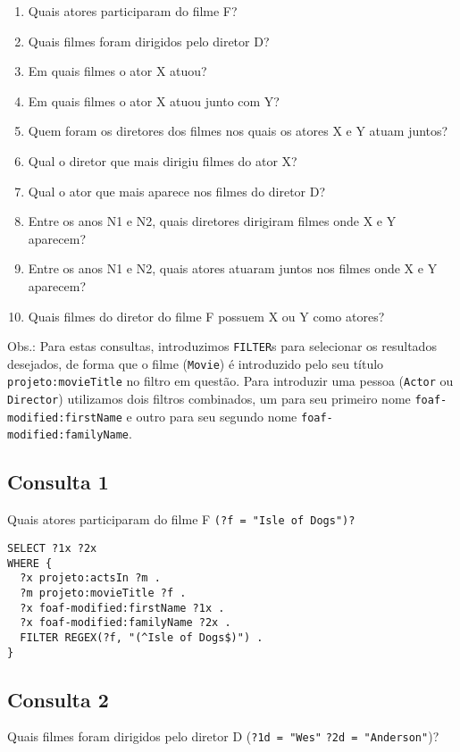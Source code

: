 \documentclass{article}
\newcommand{\code}[1]{\lstinline[mathescape=true]{#1}}
\begin{document}
\begin{enumerate}
  \item Quais atores participaram do filme F?
  \item Quais filmes foram dirigidos pelo diretor D?
  \item Em quais filmes o ator X atuou?
  \item Em quais filmes o ator X atuou junto com Y?
  \item Quem foram os diretores dos filmes nos quais os atores X e Y atuam juntos?
  \item Qual o diretor que mais dirigiu filmes do ator X?
  \item Qual o ator que mais aparece nos filmes do diretor D?
  \item Entre os anos N1 e N2, quais diretores dirigiram filmes onde X e Y aparecem?
  \item Entre os anos N1 e N2, quais atores atuaram juntos nos filmes onde X e Y aparecem?
  \item Quais filmes do diretor do filme F possuem X ou Y como atores?
\end{enumerate}

Obs.: Para estas consultas, introduzimos \code{FILTER}s para selecionar os resultados desejados, de forma que o filme (\code{Movie}) é introduzido pelo seu título \code{projeto:movieTitle} no filtro em questão. Para introduzir uma pessoa (\code{Actor} ou \code{Director}) utilizamos dois filtros combinados, um para seu primeiro nome \code{foaf-modified:firstName} e outro para seu segundo nome \code{foaf-modified:familyName}.
\subsection{Consulta 1}

Quais atores participaram do filme F \code{(?f = "Isle of Dogs")?}

\begin{lstlisting}[basicstyle=\ttfamily,frame=single]
SELECT ?1x ?2x
WHERE {
  ?x projeto:actsIn ?m .
  ?m projeto:movieTitle ?f .
  ?x foaf-modified:firstName ?1x .
  ?x foaf-modified:familyName ?2x .
  FILTER REGEX(?f, "(^Isle of Dogs$)") .
}
\end{lstlisting}
\subsection{Consulta 2}
Quais filmes foram dirigidos pelo diretor D (\code{?1d = "Wes"} \code{?2d = "Anderson"})?
\end{document}
